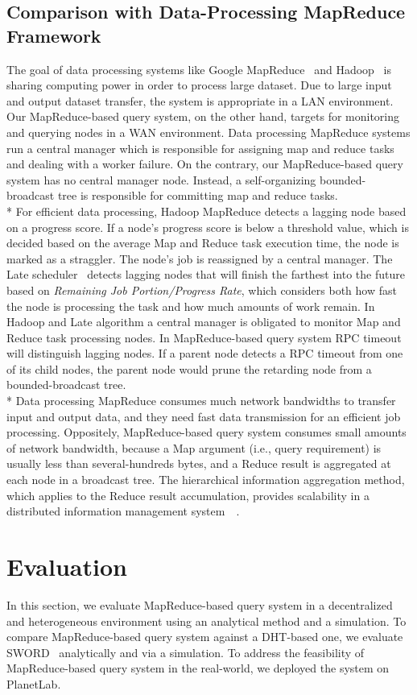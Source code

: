 \documentclass{acm_proc_article-sp}
\begin{document}
\subsection{Comparison with Data-Processing MapReduce Framework}
The goal of data processing systems like Google MapReduce~\cite{google_mapreduce} and Hadoop~\cite{hadoop} is sharing computing power in order to process large dataset. 
Due to large input and output dataset transfer, the system is appropriate in a LAN environment.
Our MapReduce-based query system, on the other hand, targets for monitoring and querying nodes in a WAN environment.
Data processing MapReduce systems run a central manager which is responsible for assigning map and reduce tasks and dealing with a  worker failure.
On the contrary, our MapReduce-based query system has no central manager node. Instead, a self-organizing bounded-broadcast tree is responsible for committing map and reduce tasks.\\*
For efficient data processing, Hadoop MapReduce detects a lagging node based on a progress score.
If a node's progress score is below a threshold value, which is decided based on the average Map and Reduce task execution time, the node is marked as a straggler. The node's job is reassigned by a central manager.
The Late scheduler~\cite{late} detects lagging nodes that will finish the farthest into the future based on \textit{Remaining Job Portion/Progress Rate}, which considers both
how fast the node is processing the task and how much amounts of work remain. 
In Hadoop and Late algorithm a central manager is obligated to monitor Map and Reduce task processing nodes. 
In MapReduce-based query system RPC timeout will distinguish lagging nodes. If a parent node detects a RPC timeout from one of its child nodes, the parent node would prune the retarding node from a bounded-broadcast tree.\\*
Data processing MapReduce consumes much network bandwidths to transfer input and output data, and they need fast data transmission for an efficient job processing. 
Oppositely, MapReduce-based query system consumes small amounts of network bandwidth, because a Map argument (i.e., query requirement) is usually less than several-hundreds bytes, and a Reduce result is aggregated at each node in a broadcast tree.
The hierarchical information aggregation method, which applies to the Reduce result accumulation, provides scalability in a distributed information management system~\cite{astrobe}~\cite{treedatamanage}.
\section{Evaluation}
In this section, we evaluate MapReduce-based query system in a decentralized and heterogeneous environment using an analytical method and a simulation. 
To compare MapReduce-based query system against a DHT-based one, we evaluate SWORD~\cite{sword} analytically and via a simulation.
To address the feasibility of MapReduce-based query system in the real-world, we deployed the system on PlanetLab. 
\end{document}
